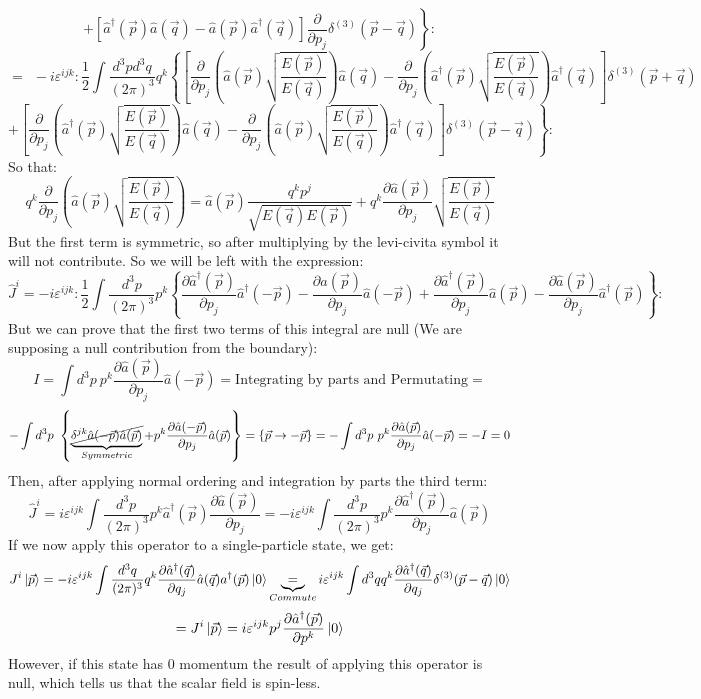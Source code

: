 \documentclass[12pt]{article}
\begin{document}
\[
    \left.+ \left[\hat{a}^\dagger(\vec{p})\hat{a}(\vec{q})-\hat{a}(\vec{p})\hat{a}^\dagger(\vec{q})\right]\frac{\partial}{\partial p_j}\delta^{(3)}(\vec{p}-\vec{q})\right\}:
\]
\[
    = ~~ -i\varepsilon^{ijk}:\frac{1}{2}\int \frac{d^3pd^3q}{(2\pi)^3} q^k \left\{\left[\frac{\partial}{\partial p_j}\left(\hat{a}(\vec{p})\sqrt{\frac{E(\vec{p})}{E(\vec{q})}}\right)\hat{a}(\vec{q})-\frac{\partial}{\partial p_j}\left(\hat{a}^\dagger(\vec{p})\sqrt{\frac{E(\vec{p})}{E(\vec{q})}}\right)\hat{a}^\dagger(\vec{q})\right]\delta^{(3)}(\vec{p}+\vec{q}) \right.
\]
\[
    \left.+ \left[\frac{\partial}{\partial p_j}\left(\hat{a}^\dagger(\vec{p})\sqrt{\frac{E(\vec{p})}{E(\vec{q})}}\right)\hat{a}(\vec{q})-\frac{\partial}{\partial p_j}\left(\hat{a}(\vec{p})\sqrt{\frac{E(\vec{p})}{E(\vec{q})}}\right)\hat{a}^\dagger(\vec{q})\right]\delta^{(3)}(\vec{p}-\vec{q})\right\}:
\]
So that:
\[
    q^k\frac{\partial}{\partial p_j}\left(\hat{a}(\vec{p})\sqrt{\frac{E(\vec{p})}{E(\vec{q})}}\right)=\hat{a}(\vec{p})\frac{q^kp^j}{\sqrt{E(\vec{q})E(\vec{p})}}+q^k\frac{\partial\hat{a}(\vec{p})}{\partial p_j}\sqrt{\frac{E(\vec{p})}{E(\vec{q})}}
\]
But the first term is symmetric, so after multiplying by the levi-civita symbol it will not contribute. So we will be left with the expression:
\[
    \hat{J}^i = -i\varepsilon^{ijk}:\frac{1}{2}\int\frac{d^3p}{(2\pi)^3}p^k\left\{\frac{\partial \hat{a}^\dagger(\vec{p})}{\partial p_j}\hat{a}^\dagger(-\vec{p})-\frac{\partial \hat{a}(\vec{p})}{\partial p_j}\hat{a}(-\vec{p})+\frac{\partial \hat{a}^\dagger(\vec{p})}{\partial p_j}\hat{a}(\vec{p})-\frac{\partial \hat{a}(\vec{p})}{\partial p_j}\hat{a}^\dagger(\vec{p})\right\}:
\]
But we can prove that the first two terms of this integral are null (We are supposing a null contribution from the boundary):
\[
    I = \int d^3p ~ p^k\frac{\partial\hat{a}(\vec{p})}{\partial p_j}\hat{a}(-\vec{p}) = \text{Integrating by parts and Permutating}=\]
\[
    -\int d^3p ~ \left\{\underbrace{\cancel{\delta^{jk}\hat{a}(-\vec{p})\hat{a}(\vec{p})}}_{Symmetric}+p^k\frac{\partial\hat{a}(-\vec{p})}{\partial p_j}\hat{a}(\vec{p})\right\} = \{\vec{p}\rightarrow -\vec{p}\} = -\int d^3p ~ p^k\frac{\partial\hat{a}(\vec{p})}{\partial p_j}\hat{a}(-\vec{p}) = -I = 0
\]
Then, after applying normal ordering and integration by parts the third term:
\[
    \hat{J}^i = i\varepsilon^{ijk}\int\frac{d^3p}{(2\pi)^3}p^k\hat{a}^\dagger(\vec{p})\frac{\partial \hat{a}(\vec{p})}{\partial p_j} = -i\varepsilon^{ijk}\int\frac{d^3p}{(2\pi)^3}p^k\frac{\partial \hat{a}^\dagger(\vec{p})}{\partial p_j}\hat{a}(\vec{p})
\]
If we now apply this operator to a single-particle state, we get:
\[
    J^i \ket{\vec{p}}= -i\varepsilon^{ijk}\int\frac{d^3q}{(2\pi)^3}q^k\frac{\partial \hat{a}^\dagger(\vec{q})}{\partial q_j}\hat{a}(\vec{q})a^\dagger(\vec{p})\ket{0} \underbrace{=}_{Commute} i\varepsilon^{ijk}\int d^3qq^k\frac{\partial \hat{a}^\dagger(\vec{q})}{\partial q_j}\delta^{(3)}(\vec{p}-\vec{q})\ket{0}
\]
\[
    = J^i\ket{\vec{p}} = i\varepsilon^{ijk}p^j\frac{\partial \hat{a}^\dagger(\vec{p})}{\partial p^k}\ket{0}
\]
However, if this state has 0 momentum the result of applying this operator is null, which tells us that the scalar field is spin-less.
\end{document}
